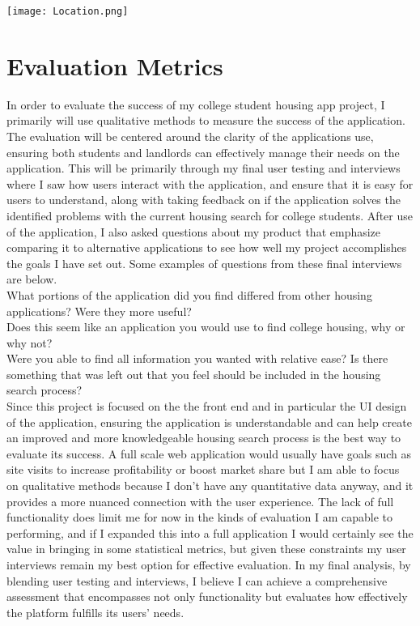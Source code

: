 \documentclass[10pt,twocolumn]{article}
\begin{document}
\centerline{\texttt{[image: Location.png]}}

\section{Evaluation Metrics}

In order to evaluate the success of my college student housing app project, I primarily will use qualitative methods to measure the success of the application. The evaluation will be centered around the clarity of the applications use, ensuring both students and landlords can effectively manage their needs on the application. This will be primarily through my final user testing and interviews where I saw how users interact with the application, and ensure that it is easy for users to understand, along with taking feedback on if the application solves the identified problems with the current housing search for college students. After use of the application, I also asked questions about my product that emphasize comparing it to alternative applications to see how well my project accomplishes the goals I have set out. Some examples of questions from these final interviews are below. \\
What portions of the application did you find differed from other housing applications? Were they more useful? \\
Does this seem like an application you would use to find college housing, why or why not? \\
Were you able to find all information you wanted with relative ease? Is there something that was left out that you feel should be included in the housing search process? \\

Since this project is focused on the the front end and in particular the UI design of the application, ensuring the application is understandable and can help create an improved and more knowledgeable housing search process is the best way to evaluate its success. A full scale web application would usually have goals such as site visits to increase profitability or boost market share but I am able to focus on qualitative methods because I don't have any quantitative data anyway, and it provides a more nuanced connection with the user experience.\cite{belanger2006web} The lack of full functionality does limit me for now in the kinds of evaluation I am capable to performing, and if I expanded this into a full application I would certainly see the value in bringing in some statistical metrics, but given these constraints my user interviews remain my best option for effective evaluation. In my final analysis, by blending user testing and interviews, I believe I can achieve a comprehensive assessment that encompasses not only functionality but evaluates how effectively the platform fulfills its users' needs.
\end{document}
